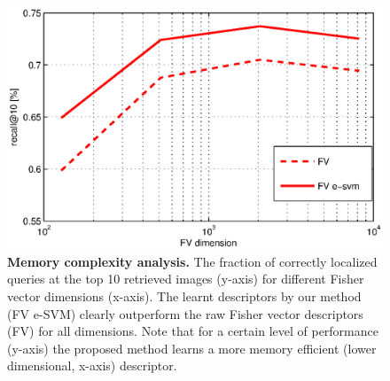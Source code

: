 \documentclass[table]{article} %
\begin{document}
			\begin{figure}[t!]
    \centering
    \includegraphics[width=0.7\linewidth]{imgs/FVmemory}    
    \caption{
        \textbf{Memory complexity analysis.} 
        The fraction of correctly localized queries at the top 10 retrieved images (y-axis) for different Fisher vector dimensions (x-axis). The learnt descriptors by our method (FV e-SVM) clearly outperform the raw Fisher vector descriptors (FV) for all dimensions. Note that for a certain level of performance (y-axis) the proposed method learns a more memory efficient (lower dimensional, x-axis) descriptor.
    }
    \label{fig:memory}
\end{figure}


			

\end{document}
